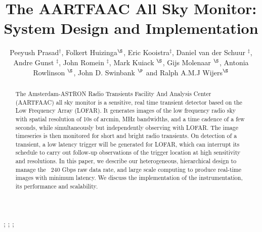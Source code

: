 \documentclass{ws-jai}
\begin{document}
\catchline{}{}{}{}{} %


\title{The AARTFAAC All Sky Monitor: System Design and Implementation}

\author{Peeyush      Prasad$^\dagger$,      Folkert     Huizinga$^\S$,      Eric   Kooistra$^\ddagger$,   Daniel  van   der  Schuur   $^\ddagger$,  Andre   Gunst   $^\ddagger$, John Romein $^\ddagger$, Mark  Kuiack $^\S$, Gijs Molenaar $^\S$,   Antonia Rowlinson $^\S$, John D. Swinbank $^\P$ and Ralph A.M.J Wijers$^\S$}

\address{ $^\dagger$Anton Pannekoek Institute, University of Amsterdam, Amsterdam, The Netherlands, p.prasad@uva.nl\\
$^\ddagger$ASTRON, Oude Hoogeveensedijk, 7991PD, The Netherlands\\
$^\S$Anton Pannekoek Institute, University of Amsterdam, Amsterdam, The Netherlands\\
$^\P$Department of Astrophysical Sciences, Princeton University, Princeton, NJ 08544, USA\\ }

\maketitle


\begin{history}
;
;
;
\end{history}

\begin{abstract}
The Amsterdam-ASTRON  Radio Transients  Facility And Analysis  Center (AARTFAAC)
all sky monitor  is a sensitive, real  time transient detector based  on the Low
Frequency Array  (LOFAR).  It generates  images of  the low frequency  radio sky
with spatial resolution of 10s of arcmin,  MHz bandwidths, and a time cadence of
a few seconds, while simultaneously but independently observing with LOFAR.  The
image timeseries  is then monitored  for short  and bright radio  transients. On
detection of  a transient, a  low latency trigger  will be generated  for LOFAR,
which can  interrupt its  schedule to  carry out  follow-up observations  of the
trigger  location  at high  sensitivity  and  resolutions.   In this  paper,  we
describe our heterogeneous, hierarchical design to manage the ~240 Gbps raw data
rate,  and  large scale  computing  to  produce  real-time images  with  minimum
latency.  We discuss the implementation  of the instrumentation, its performance
and scalability.
\end{abstract}
\end{document}
